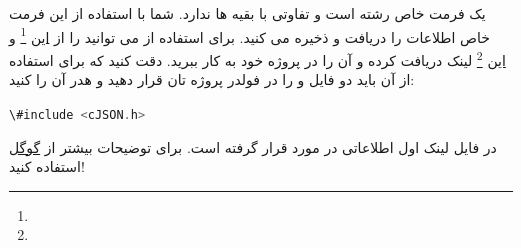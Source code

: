 \documentclass{article}
\newcommand{\codeline}[3]{
    \begin{tcolorbox}[colback=#3!5!white,colframe=#3!75!black,title=\textbf{#1}]
        \begin{latin}
            \lstinline[language=c]{#2}
        \end{latin}
    \end{tcolorbox}
}
\begin{document}
    \section{}
        
    یک فرمت خاص رشته است و تفاوتی با بقیه 
    ها ندارد. شما با استفاده از این فرمت خاص اطلاعات را دریافت و 
    ذخیره می کنید.
    برای استفاده از 
    می توانید 
    را از 
    \href{https://github.com/DaveGamble/cJSON}{این} \footnote{}
     و 
    \href{https://sourceforge.net/projects/cjson/}{این} \footnote{}
    لینک
    دریافت کرده و آن را در پروژه خود به کار ببرید.
    دقت کنید که برای استفاده از آن باید دو فایل 
    و
    را در فولدر پروژه تان قرار دهید و هدر آن را 
    کنید:
    \codeline{افزودن \lr{cJSON} به پروژه}{\#include <cJSON.h>}{green}
    
    در فایل 
    لینک اول اطلاعاتی در مورد 
    قرار گرفته است. برای توضیحات بیشتر از 
    \href{https://www.google.com/}{گوگل}
    استفاده کنید!
\end{document}

